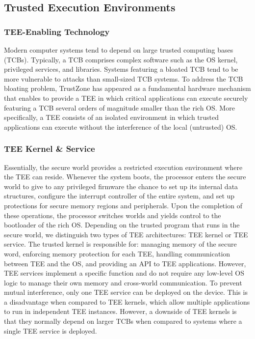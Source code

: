 \documentclass{article}
\begin{document}
\subsection{Trusted Execution Environments}

\subsubsection{TEE-Enabling Technology}

Modern computer systems tend to depend on large trusted computing bases (TCBs). Typically, a TCB comprises complex software such as the OS kernel, privileged services, and libraries. Systems featuring a bloated TCB tend to be more vulnerable to attacks than small-sized TCB systems. To address the TCB bloating problem, TrustZone has appeared as a fundamental hardware mechanism that enables to provide a TEE in which critical applications can execute securely featuring a TCB several orders of magnitude smaller than the rich OS. More specifically, a TEE consists of an isolated environment in which trusted applications can execute without the interference of the local (untrusted) OS.

\subsubsection{TEE Kernel \& Service}

Essentially, the secure world provides a restricted execution environment where the TEE can reside. Whenever the system boots, the processor enters the secure world to give to any privileged firmware the chance to set up its internal data structures, configure the interrupt controller of the entire system, and set up protections for secure memory regions and peripherals. Upon the completion of these operations, the processor switches worlds and yields control to the bootloader of the rich OS. Depending on the trusted program that runs in the secure world, we distinguish two types of TEE architectures: TEE kernel or TEE service. The trusted kernel is responsible for: managing memory of the secure word, enforcing memory protection for each TEE, handling communication between TEE and the OS, and providing an API to TEE applications. However, TEE services implement a specific function and do not require any low-level OS logic to manage their own memory and cross-world communication. To prevent mutual interference, only one TEE service can be deployed on the device. This is a disadvantage when compared to TEE kernels, which allow multiple applications to run in independent TEE instances. However, a downside of TEE kernels is that they normally depend on larger TCBs when compared to systems where a single TEE service is deployed.
\end{document}
